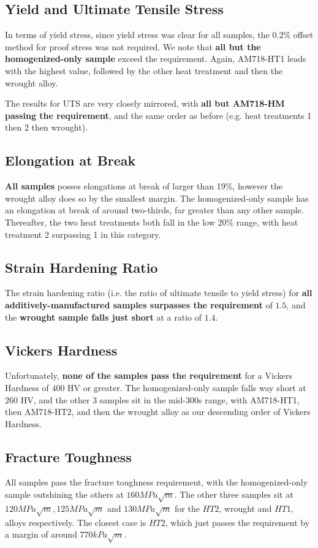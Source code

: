 \documentclass{article}
\begin{document}
\subsection{Yield and Ultimate Tensile Stress}
In terms of yield stress, since yield stress was clear for all samples, the $0.2\%$ offset method for proof stress was not required. We note that \textbf{all but the homogenized-only sample} exceed the requirement. Again, AM718-HT1 leads with the highest value, followed by the other heat treatment and then the wrought alloy.

The results for UTS are very closely mirrored, with \textbf{all but AM718-HM passing the requirement}, and the same order as before (e.g. heat treatments 1 then 2 then wrought).

\subsection{Elongation at Break}
\textbf{All samples} posses elongations at break of larger than 19\%, however the wrought alloy does so by the smallest margin. The homogenized-only sample has an elongation at break of around two-thirds, far greater than any other sample. Thereafter, the two heat treatments both fall in the low 20\% range, with heat treatment 2 surpassing 1 in this category.

\subsection{Strain Hardening Ratio}
The strain hardening ratio (i.e. the ratio of ultimate tensile to yield stress) for \textbf{all additively-manufactured samples surpasses the requirement} of $1.5$, and the \textbf{wrought sample falls just short} at a ratio of $1.4$. 

\subsection{Vickers Hardness}
Unfortunately, \textbf{none of the samples pass the requirement} for a Vickers Hardness of $400$ HV or greater. The homogenized-only sample falls way short at $260$ HV, and the other 3 samples sit in the mid-300s range, with AM718-HT1, then AM718-HT2, and then the wrought alloy as our descending order of Vickers Hardness.


\subsection{Fracture Toughness}
All samples pass the fracture toughness requirement, with the homogenized-only sample outshining the others at $160 MPa \sqrt{m}$. The other three samples sit at $120MPa \sqrt{m}, 125MPa \sqrt{m}$ and $130MPa \sqrt{m}$ for the $HT2$, wrought and $HT1$, alloys respectively. The closest case is $HT2$, which just passes the requirement by a margin of around $770kPa \sqrt{m}$.
\end{document}
